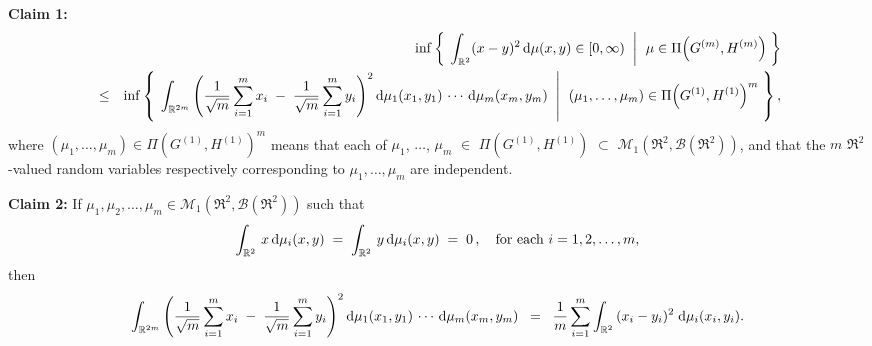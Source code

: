 \begin{center}
\begin{minipage}{6.5in}
\noindent
\vskip 0.5cm
\textbf{Claim 1:}
\begin{eqnarray*}
&&
	\inf\left\{\; \left. \int_{\mathbb{R}^{2}}(x - y)^{2}\,\textnormal{d}\mu(x,y) \in [0,\infty) \;\;\right\vert\;\, \mu \in \Pi\!\left(G^{(m)},H^{(m)}\right) \;\right\}
\\
&\leq&
	\inf\left\{\; \left.
	\int_{\mathbb{R}^{2m}}\left(\dfrac{1}{\sqrt{m}}\sum_{i=1}^{m}x_{i} \;-\; \dfrac{1}{\sqrt{m}}\sum_{i=1}^{m}y_{i}\right)^{2}
	\textnormal{d}\mu_{1}(x_{1},y_{1})\,\cdots\,\textnormal{d}\mu_{m}(x_{m},y_{m})
	\;\;\right\vert\;\,
	(\mu_{1},\ldots,\mu_{m}) \in \Pi\!\left(G^{(1)},H^{(1)}\right)^{m}
	\;\right\},
\end{eqnarray*}
where
$(\mu_{1},\ldots,\mu_{m}) \in \Pi\!\left(G^{(1)},H^{(1)}\right)^{m}$ means that
each of $\mu_{1}$, $\ldots$, $\mu_{m}$ $\in$ $\Pi\!\left(G^{(1)},H^{(1)}\right)$
$\subset$ $\mathcal{M}_{1}(\Re^{2},\mathcal{B}(\Re^{2}))$,
and that the $m$ $\Re^{2}$-valued random variables  respectively corresponding to
$\mu_{1}, \ldots, \mu_{m}$ are independent.

\vskip 0.8cm
\textbf{Claim 2:}\quad
If\; $\mu_{1}, \mu_{2}, \ldots, \mu_{m} \in \mathcal{M}_{1}(\Re^{2},\mathcal{B}(\Re^{2}))$\; such that
\begin{equation*}
\int_{\mathbb{R}^{2}}\,x\,\textnormal{d}\mu_{i}(x,y) \;=\; \int_{\mathbb{R}^{2}}\,y\,\textnormal{d}\mu_{i}(x,y) \;=\; 0\,,
\quad\textnormal{for each $i = 1, 2, \ldots, m$},
\end{equation*}
then
\begin{equation*}
	\int_{\mathbb{R}^{2m}}\left(\dfrac{1}{\sqrt{m}}\sum_{i=1}^{m}x_{i} \;-\; \dfrac{1}{\sqrt{m}}\sum_{i=1}^{m}y_{i}\right)^{2}
	\textnormal{d}\mu_{1}(x_{1},y_{1})\,\cdots\,\textnormal{d}\mu_{m}(x_{m},y_{m})
	\;\; = \;\;
	\dfrac{1}{m}\sum_{i=1}^{m}\int_{\mathbb{R}^{2}}\,(x_{i}-y_{i})^{2}\;\textnormal{d}\mu_{i}(x_{i},y_{i}).
\end{equation*}
\end{minipage}
\end{center}

